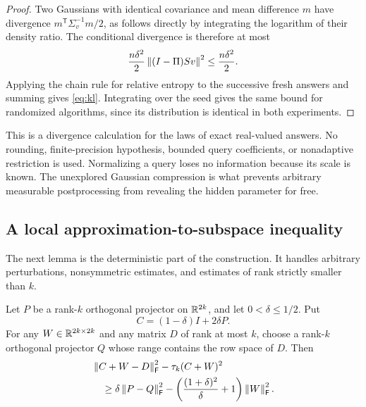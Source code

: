 \begin{proof}
Two Gaussians with identical covariance and mean difference $m$ have
divergence $m^{\mathsf T}\Sigma_v^{-1}m/2$, as follows directly by integrating
the logarithm of their density ratio. The conditional divergence is therefore
at most
\[
 \frac{n\delta^2}{2}\left\lVert (I-\Pi)Sv\right\rVert^2
 \le\frac{n\delta^2}{2}.
\]
Applying the chain rule for relative entropy to the successive fresh answers
and summing gives \eqref{eq:kl}. Integrating over the seed gives the same bound
for randomized algorithms, since its distribution is identical in both
experiments.
\end{proof}

\begin{remark}
This is a divergence calculation for the laws of exact real-valued answers.
No rounding, finite-precision hypothesis, bounded query coefficients, or
nonadaptive restriction is used. Normalizing a query loses no information
because its scale is known. The unexplored Gaussian compression is what
prevents arbitrary measurable postprocessing from revealing the hidden
parameter for free.
\end{remark}

\subsection{A local approximation-to-subspace inequality}

The next lemma is the deterministic part of the construction. It handles
arbitrary perturbations, nonsymmetric estimates, and estimates of rank
strictly smaller than $k$.

\begin{lemma}\label{lem:local}
Let $P$ be a rank-$k$ orthogonal projector on $\mathbb R^{2k}$, and let
$0<\delta\le1/2$. Put
\[
 C=(1-\delta)I+2\delta P.
\]
For any $W\in\mathbb R^{2k\times2k}$ and any matrix $D$ of rank at most $k$, choose
a rank-$k$ orthogonal projector $Q$ whose range contains the row space of $D$.
Then
\begin{align}\label{eq:local}
 &\left\lVert C+W-D\right\rVert_{\mathsf F}^2-\tau_k(C+W)^2\notag\\
 &\hspace{1em}\ge
 \delta\left\lVert P-Q\right\rVert_{\mathsf F}^2
 -\left(\frac{(1+\delta)^2}{\delta}+1\right)\left\lVert W\right\rVert_{\mathsf F}^2.
\end{align}
\end{lemma}

